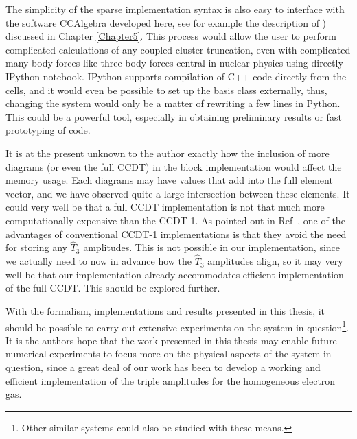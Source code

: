 The simplicity of the sparse implementation syntax is also easy to
interface with the software CCAlgebra developed here, see for example
the description of \cite{CCAlgebra}) discussed in Chapter
\ref{Chapter5}. This process would allow the user to perform
complicated calculations of any coupled cluster truncation, even with
complicated many-body forces like three-body forces central in nuclear
physics using directly IPython notebook. IPython supports compilation
of C++ code directly from the cells, and it would even be possible to
set up the basis class externally, thus, changing the system would only
be a matter of rewriting a few lines in Python. This could be a
powerful tool, especially in obtaining preliminary results or fast
prototyping of code.

It is at the present unknown to the author exactly how the inclusion
of more diagrams (or even the full CCDT) in the block implementation
would affect the memory usage. Each diagrams may have values that add
into the full element vector, and we have observed quite a large
intersection between these elements. It could very well be that a full
CCDT implementation is not that much more computationally expensive
than the CCDT-1. As pointed out in
Ref~\cite[p.351]{ShavittBartlett2009}, one of the advantages of
conventional CCDT-1 implementations is that they avoid the need for
storing any $\hat{T}_3$ amplitudes. This is not possible in our
implementation, since we actually need to now in advance how the
$\hat{T}_3$ amplitudes align, so it may very well be that our
implementation already accommodates efficient implementation of the
full CCDT. This should be explored further.

With the formalism, implementations and results presented in this
thesis, it should be possible to carry out extensive experiments on
the system in question\footnote{Other similar systems could also be
  studied with these means.}. It is the authors hope that the work
presented in this thesis may enable future numerical experiments to focus more
on the physical aspects of the system in question, since a great deal
of our work has been to develop a working and efficient implementation
of the triple amplitudes for the homogeneous electron gas.

